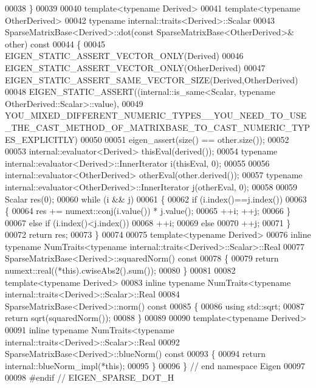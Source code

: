 \begin{DoxyCode}
00038 \}
00039 
00040 \textcolor{keyword}{template}<\textcolor{keyword}{typename} Derived>
00041 \textcolor{keyword}{template}<\textcolor{keyword}{typename} OtherDerived>
00042 \textcolor{keyword}{typename} internal::traits<Derived>::Scalar
00043 SparseMatrixBase<Derived>::dot(\textcolor{keyword}{const} SparseMatrixBase<OtherDerived>& other)\textcolor{keyword}{ const}
00044 \textcolor{keyword}{}\{
00045   EIGEN\_STATIC\_ASSERT\_VECTOR\_ONLY(Derived)
00046   EIGEN\_STATIC\_ASSERT\_VECTOR\_ONLY(OtherDerived)
00047   EIGEN\_STATIC\_ASSERT\_SAME\_VECTOR\_SIZE(Derived,OtherDerived)
00048   EIGEN\_STATIC\_ASSERT((internal::is\_same<Scalar, typename OtherDerived::Scalar>::value),
00049     
      YOU\_MIXED\_DIFFERENT\_NUMERIC\_TYPES\_\_YOU\_NEED\_TO\_USE\_THE\_CAST\_METHOD\_OF\_MATRIXBASE\_TO\_CAST\_NUMERIC\_TYPES\_EXPLICITLY)
00050 
00051   eigen\_assert(size() == other.size());
00052 
00053   internal::evaluator<Derived> thisEval(derived());
00054   \textcolor{keyword}{typename} internal::evaluator<Derived>::InnerIterator i(thisEval, 0);
00055   
00056   internal::evaluator<OtherDerived>  otherEval(other.derived());
00057   \textcolor{keyword}{typename} internal::evaluator<OtherDerived>::InnerIterator j(otherEval, 0);
00058 
00059   Scalar res(0);
00060   \textcolor{keywordflow}{while} (i && j)
00061   \{
00062     \textcolor{keywordflow}{if} (i.index()==j.index())
00063     \{
00064       res += numext::conj(i.value()) * j.value();
00065       ++i; ++j;
00066     \}
00067     \textcolor{keywordflow}{else} \textcolor{keywordflow}{if} (i.index()<j.index())
00068       ++i;
00069     \textcolor{keywordflow}{else}
00070       ++j;
00071   \}
00072   \textcolor{keywordflow}{return} res;
00073 \}
00074 
00075 \textcolor{keyword}{template}<\textcolor{keyword}{typename} Derived>
00076 \textcolor{keyword}{inline} \textcolor{keyword}{typename} NumTraits<typename internal::traits<Derived>::Scalar>::Real
00077 SparseMatrixBase<Derived>::squaredNorm()\textcolor{keyword}{ const}
00078 \textcolor{keyword}{}\{
00079   \textcolor{keywordflow}{return} numext::real((*this).cwiseAbs2().sum());
00080 \}
00081 
00082 \textcolor{keyword}{template}<\textcolor{keyword}{typename} Derived>
00083 \textcolor{keyword}{inline} \textcolor{keyword}{typename} NumTraits<typename internal::traits<Derived>::Scalar>::Real
00084 SparseMatrixBase<Derived>::norm()\textcolor{keyword}{ const}
00085 \textcolor{keyword}{}\{
00086   \textcolor{keyword}{using} std::sqrt;
00087   \textcolor{keywordflow}{return} sqrt(squaredNorm());
00088 \}
00089 
00090 \textcolor{keyword}{template}<\textcolor{keyword}{typename} Derived>
00091 \textcolor{keyword}{inline} \textcolor{keyword}{typename} NumTraits<typename internal::traits<Derived>::Scalar>::Real
00092 SparseMatrixBase<Derived>::blueNorm()\textcolor{keyword}{ const}
00093 \textcolor{keyword}{}\{
00094   \textcolor{keywordflow}{return} internal::blueNorm\_impl(*\textcolor{keyword}{this});
00095 \}
00096 \} \textcolor{comment}{// end namespace Eigen}
00097 
00098 \textcolor{preprocessor}{#endif // EIGEN\_SPARSE\_DOT\_H}
\end{DoxyCode}
